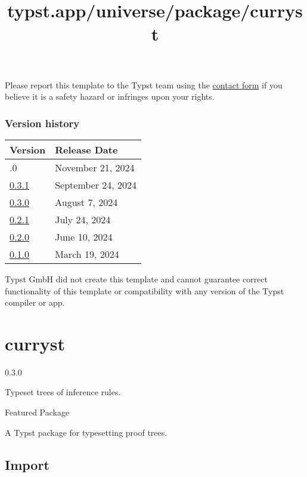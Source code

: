 Please report this template to the Typst team using the
\href{https://typst.app/contact}{contact form} if you believe it is a
safety hazard or infringes upon your rights.

\label{versions}
\subsubsection{Version history}\label{version-history}

\begin{longtable}[]{@{}ll@{}}
\toprule\noalign{}
Version & Release Date \\
\midrule\noalign{}
\endhead
\bottomrule\noalign{}
\endlastfoot
0.4.0 & November 21, 2024 \\
\href{https://typst.app/universe/package/silky-report-insa/0.3.1/}{0.3.1}
& September 24, 2024 \\
\href{https://typst.app/universe/package/silky-report-insa/0.3.0/}{0.3.0}
& August 7, 2024 \\
\href{https://typst.app/universe/package/silky-report-insa/0.2.1/}{0.2.1}
& July 24, 2024 \\
\href{https://typst.app/universe/package/silky-report-insa/0.2.0/}{0.2.0}
& June 10, 2024 \\
\href{https://typst.app/universe/package/silky-report-insa/0.1.0/}{0.1.0}
& March 19, 2024 \\
\end{longtable}

Typst GmbH did not create this template and cannot guarantee correct
functionality of this template or compatibility with any version of the
Typst compiler or app.


\title{typst.app/universe/package/curryst}

\label{banner}
\section{curryst}\label{curryst}

{ 0.3.0 }

Typeset trees of inference rules.

{ } Featured Package

\label{readme}
A Typst package for typesetting proof trees.

\subsection{Import}\label{import}

